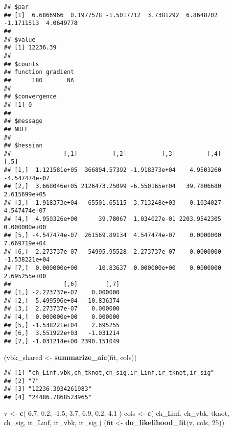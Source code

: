 \documentclass[
]{article}
\newenvironment{Shaded}{\begin{snugshade}}{\end{snugshade}}
\newcommand{\DecValTok}[1]{\textcolor[rgb]{0.00,0.00,0.81}{#1}}
\newcommand{\FloatTok}[1]{\textcolor[rgb]{0.00,0.00,0.81}{#1}}
\newcommand{\KeywordTok}[1]{\textcolor[rgb]{0.13,0.29,0.53}{\textbf{#1}}}
\newcommand{\NormalTok}[1]{#1}
\newcommand{\StringTok}[1]{\textcolor[rgb]{0.31,0.60,0.02}{#1}}
\begin{document}
\begin{verbatim}
## $par
## [1]  6.6866966  0.1977578 -1.5017712  3.7381292  6.8648702 -1.1711513  4.0649778
## 
## $value
## [1] 12236.39
## 
## $counts
## function gradient 
##      180       NA 
## 
## $convergence
## [1] 0
## 
## $message
## NULL
## 
## $hessian
##               [,1]          [,2]          [,3]         [,4]          [,5]
## [1,]  1.121581e+05  366804.57392 -1.918373e+04    4.9503260 -4.547474e-07
## [2,]  3.668046e+05 2126473.25099 -6.550165e+04   39.7806680  2.615699e+05
## [3,] -1.918373e+04  -65501.65115  3.713248e+03    0.1034027  4.547474e-07
## [4,]  4.950326e+00      39.78067  1.034027e-01 2203.9542305  0.000000e+00
## [5,] -4.547474e-07  261569.89134  4.547474e-07    0.0000000  7.669719e+04
## [6,] -2.273737e-07  -54995.95528  2.273737e-07    0.0000000 -1.538221e+04
## [7,]  0.000000e+00     -10.83637  0.000000e+00    0.0000000  2.695255e+00
##               [,6]        [,7]
## [1,] -2.273737e-07    0.000000
## [2,] -5.499596e+04  -10.836374
## [3,]  2.273737e-07    0.000000
## [4,]  0.000000e+00    0.000000
## [5,] -1.538221e+04    2.695255
## [6,]  3.551922e+03   -1.031214
## [7,] -1.031214e+00 2390.151049
\end{verbatim}

\begin{Shaded}
\begin{Highlighting}[]
\NormalTok{(vbk\_shared \textless{}{-}}\StringTok{ }\KeywordTok{summarize\_aic}\NormalTok{(fit, cols))}
\end{Highlighting}
\end{Shaded}

\begin{verbatim}
## [1] "ch_Linf,vbk,ch_tknot,ch_sig,ir_Linf,ir_tknot,ir_sig"
## [2] "7"                                                  
## [3] "12236.3934261983"                                   
## [4] "24486.7868523965"
\end{verbatim}

\begin{Shaded}
\begin{Highlighting}[]
\NormalTok{v \textless{}{-}}\StringTok{ }\KeywordTok{c}\NormalTok{(}
  \FloatTok{6.7}\NormalTok{, }\FloatTok{0.2}\NormalTok{, }\FloatTok{{-}1.5}\NormalTok{,  }\FloatTok{3.7}\NormalTok{,}
  \FloatTok{6.9}\NormalTok{,  }\FloatTok{0.2}\NormalTok{, }\FloatTok{4.1}
\NormalTok{) }
\NormalTok{cols \textless{}{-}}\StringTok{ }\KeywordTok{c}\NormalTok{(}
  \StringTok{\textquotesingle{}ch\_Linf\textquotesingle{}}\NormalTok{, }\StringTok{\textquotesingle{}ch\_vbk\textquotesingle{}}\NormalTok{, }\StringTok{\textquotesingle{}tknot\textquotesingle{}}\NormalTok{, }\StringTok{\textquotesingle{}ch\_sig\textquotesingle{}}\NormalTok{,}
  \StringTok{\textquotesingle{}ir\_Linf\textquotesingle{}}\NormalTok{, }\StringTok{\textquotesingle{}ir\_vbk\textquotesingle{}}\NormalTok{, }\StringTok{\textquotesingle{}ir\_sig\textquotesingle{}}
\NormalTok{)}
\NormalTok{(fit \textless{}{-}}\StringTok{ }\KeywordTok{do\_likelihood\_fit}\NormalTok{(v, cols, }\DecValTok{25}\NormalTok{))}
\end{Highlighting}
\end{Shaded}
\end{document}
